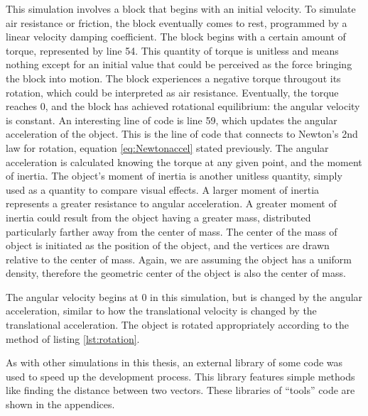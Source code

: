 This simulation involves a block that begins with an initial velocity.  To simulate air resistance or friction, the block eventually comes to rest, programmed by a linear velocity damping coefficient.  The block begins with a certain amount of torque, represented by line 54.  This quantity of torque is unitless and means nothing except for an initial value that could be perceived as the force bringing the block into motion.  The block experiences a negative torque througout its rotation, which could be interpreted as air resistance.  Eventually, the torque reaches 0, and the block has achieved rotational equilibrium: the angular velocity is constant.  An interesting line of code is line 59, which updates the angular acceleration of the object.  This is the line of code that connects to Newton's 2nd law for rotation, equation \ref{eq:Newtonaccel} stated previously.  The angular acceleration is calculated knowing the torque at any given point, and the moment of inertia.  The object's moment of inertia is another unitless quantity, simply used as a quantity to compare visual effects.  A larger moment of inertia represents a greater resistance to angular acceleration.  A greater moment of inertia could result from the object having a greater mass, distributed particularly farther away from the center of mass.  The center of the mass of object is initiated as the position of the object, and the vertices are drawn relative to the center of mass.  Again, we are assuming the object has a uniform density, therefore the geometric center of the object is also the center of mass.  

The angular velocity begins at 0 in this simulation, but is changed by the angular acceleration, similar to how the translational velocity is changed by the translational acceleration.  The object is rotated appropriately according to the method of listing \ref{lst:rotation}.  

As with other simulations in this thesis, an external library of some code was used to speed up the development process.  This library features simple methods like finding the distance between two vectors.  These libraries of ``tools'' code are shown in the appendices.  



















